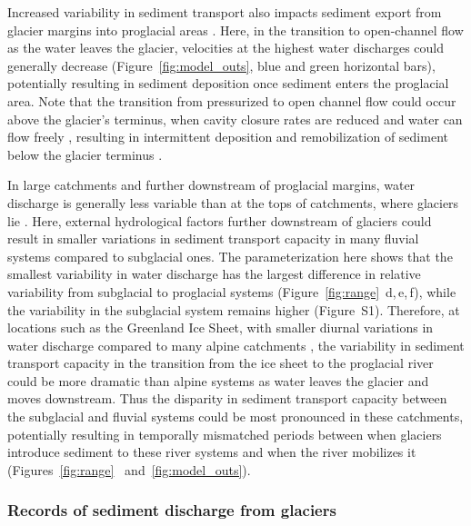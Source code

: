 \documentclass[11pt]{article}
\begin{document}
\begin{spacing}{1}
  Increased variability in sediment transport also impacts sediment export from glacier margins into proglacial areas \citep[e.g.][]{delaney2017,perolo2018}.
  Here, in the transition to open-channel flow as the water leaves the glacier, velocities at the highest water discharges could generally decrease (Figure~\ref{fig:model_outs}, blue and green horizontal bars), potentially resulting in sediment deposition once sediment enters the proglacial area.
  Note that the transition from pressurized to open channel flow could occur above the glacier's terminus, when cavity closure rates are reduced and water can flow freely \citep{egli2021b}, resulting in intermittent deposition and remobilization of sediment below the glacier terminus \citep{perolo2018}.
  
  In large catchments and further downstream of proglacial margins, water discharge is generally less variable than at the tops of catchments, where glaciers lie \citep[c.f.][]{costa2017,vanas2017,delaney2018,hasholt2018}.
  Here, external hydrological factors further downstream of glaciers could result in smaller variations in sediment transport capacity in many fluvial systems compared to subglacial ones.
  The parameterization here shows that the smallest variability in water discharge has the largest difference in relative variability from subglacial to proglacial systems (Figure~\ref{fig:range}\, d,\,e,\,f), while the variability in the subglacial system remains higher (Figure~S1).
  Therefore, at locations such as the Greenland Ice Sheet, with smaller diurnal variations in water discharge compared to many alpine catchments \citep[c.f.][]{delaney2018,hasholt2018}, the variability in sediment transport capacity in the transition from the ice sheet to the proglacial river could be more dramatic than alpine systems as water leaves the glacier and moves downstream.
  Thus the disparity in sediment transport capacity between the subglacial and fluvial systems could be most pronounced in these catchments, potentially resulting in temporally mismatched periods between when glaciers introduce sediment to these river systems  and when the river mobilizes it (Figures~\ref{fig:range}~ and~\ref{fig:model_outs}).
  
  
  \subsubsection{Records of sediment discharge  from glaciers}
  

\end{spacing}
\end{document}
